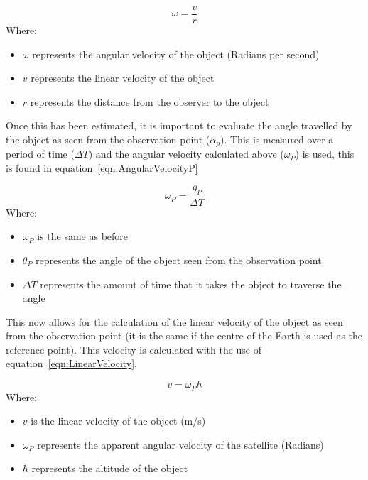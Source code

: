 \documentclass[11pt]{witseiepaper}
\begin{document}
\begin{bibunit}[witseie]
\begin{equation} \label{eqn:AngularVelocity}
\omega = \frac{v}{r}
\end{equation}
Where:
\begin{itemize}
    \item $\omega$ represents the angular velocity of the object (Radians per second)
    \item $v$ represents the linear velocity of the object
    \item $r$ represents the distance from the observer to the object
\end{itemize}

Once this has been estimated, it is important to evaluate the angle travelled by the object as seen from the observation point ($\alpha_{p}$). This is measured over a period of time ($\Delta T$) and the angular velocity calculated above ($\omega_{P}$) is used, this is found in equation~\ref{eqn:AngularVelocityP}

\begin{equation} \label{eqn:AngularVelocityP}
    \omega_{P} = \frac{\theta_{P}}{\Delta T}
\end{equation}
Where:
\begin{itemize}
    \item $\omega_{P}$ is the same as before
    \item $\theta_{P}$ represents the angle of the object seen from the observation point
    \item $\Delta T$ represents the amount of time that it takes the object to traverse the angle
\end{itemize}

This now allows for the calculation of the linear velocity of the object as seen from the observation point (it is the same if the centre of the Earth is used as the reference point). This velocity is calculated with the use of equation~\ref{eqn:LinearVelocity}.

\begin{equation} \label{eqn:LinearVelocity}
    v = \omega_{P} h
\end{equation}
Where:
\begin{itemize}
    \item $v$ is the linear velocity of the object (m/s)
    \item $\omega_{P}$ represents the apparent angular velocity of the satellite (Radians)
    \item $h$ represents the altitude of the object
\end{itemize}



\end{bibunit}
\end{document}

